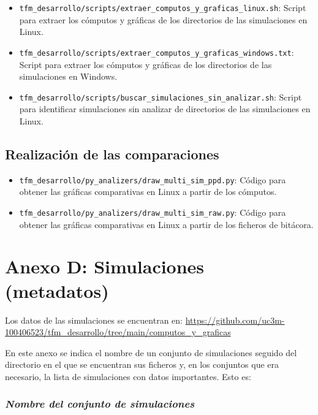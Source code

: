 \documentclass[12pt]{report} %
\begin{document}
\begin{itemize}
\item \verb|tfm_desarrollo/scripts/extraer_computos_y_graficas_linux.sh|: Script para extraer los cómputos y gráficas de los directorios de las simulaciones en Linux.
\item \verb|tfm_desarrollo/scripts/extraer_computos_y_graficas_windows.txt|: Script para extraer los cómputos y gráficas de los directorios de las simulaciones en Windows.
\item \verb|tfm_desarrollo/scripts/buscar_simulaciones_sin_analizar.sh|: Script para identificar simulaciones sin analizar de directorios de las simulaciones en Linux.
\end{itemize}

\section* {Realización de las comparaciones}

\begin{itemize}
\item \verb|tfm_desarrollo/py_analizers/draw_multi_sim_ppd.py|: Código para obtener las gráficas comparativas en Linux a partir de los cómputos.
\item \verb|tfm_desarrollo/py_analizers/draw_multi_sim_raw.py|: Código para obtener las gráficas comparativas en Linux a partir de los ficheros de bitácora.
\end{itemize}











\chapter* {Anexo D: Simulaciones (metadatos)}

Los datos de las simulaciones se encuentran en: \url{https://github.com/uc3m-100406523/tfm_desarrollo/tree/main/computos_y_graficas}

En este anexo se indica el nombre de un conjunto de simulaciones seguido del directorio en el que se encuentran sus ficheros y, en los conjuntos que era necesario, la lista de simulaciones con datos importantes.
Esto es:

\subsection* {\textit{Nombre del conjunto de simulaciones}}
\end{document}
